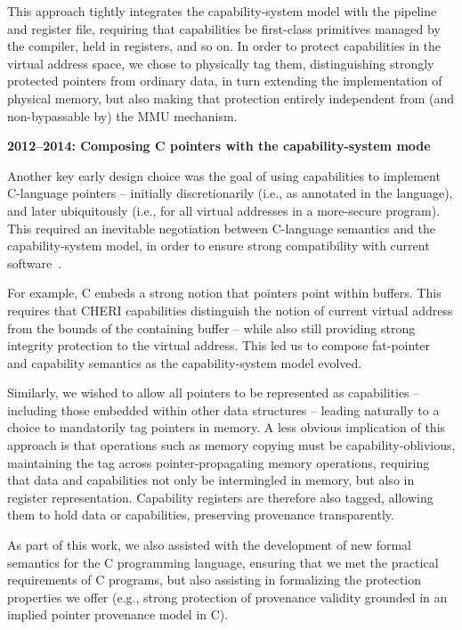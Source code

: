 This approach tightly integrates the capability-system model with the pipeline
and register file, requiring that capabilities be first-class primitives
managed by the compiler, held in registers, and so on.
In order to protect capabilities in the virtual address space, we chose to
physically tag them, distinguishing strongly protected pointers from ordinary
data, in turn extending the implementation of physical memory, but also making
that protection entirely independent from (and non-bypassable by) the MMU
mechanism.

\medskip
\noindent
\textbf{2012--2014: Composing C pointers with the capability-system mode}

\smallskip
\noindent
Another key early design choice was the goal of using capabilities to
implement C-language pointers -- initially discretionarily (i.e., as annotated
in the language), and later ubiquitously (i.e., for all virtual addresses in a
more-secure program).
This required an inevitable negotiation between C-language semantics and the
capability-system model, in order to ensure strong compatibility with current
software~\cite{ChisnallCPDP11,Cerberus-PLDI16}.

For example, C embeds a strong notion that pointers point within buffers.
This requires that CHERI capabilities distinguish the notion of current virtual
address from the bounds of the containing buffer -- while also still providing
strong integrity protection to the virtual address.
This led us to compose
fat-pointer~\cite{trevor:cyclone,Nagarakatte:2009:SHC:1542476.1542504,Necula:2002:CTR:503272.503286} and capability
semantics as the capability-system model evolved.

Similarly, we wished to allow all pointers to be represented as capabilities
-- including those embedded within other data structures -- leading naturally
to a choice to mandatorily tag pointers in memory.
A less obvious implication of this approach is that operations such as memory
copying must be capability-oblivious, maintaining the tag across
pointer-propagating memory operations, requiring that data and capabilities
not only be intermingled in memory, but also in register representation.
Capability registers are therefore also tagged, allowing them to hold data or
capabilities, preserving provenance transparently.

As part of this work, we also assisted with the development of new formal
semantics for the C programming language, ensuring that we met the practical
requirements of C programs, but also assisting in formalizing the protection
properties we offer (e.g., strong protection of provenance validity grounded
in an implied pointer provenance model in C).

